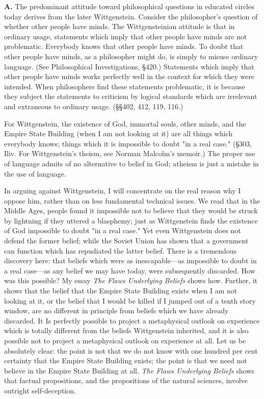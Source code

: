 \documentclass[10pt,twoside]{memoir}
\newcommand{\essaytitle}[1]{
	\emph{#1}}
\begin{document}
\begin{enumerate}
\textbf{A.} The predominant attitude toward philosophical questions in 
educated circles today derives from the later Wittgenstein. Consider the 
philosopher's question of whether other people have minds. The 
Wittgensteinian attitude is that in ordinary usage, statements which imply 
that other people have minds are not problematic. Everybody knows that 
other people have minds. To doubt that other people have minds, as a 
philosopher might do, is simply to misuse ordinary language. (See 
Philosophical Investigations, \S 420.) Statements which imply that other 
people have minds works perfectly well in the context for which they were 
intended. When philosophers find these statements problematic, it is because 
they subject the statements to criticism by logical standards which are 
irrelevant and extraneous to ordinary usage. (\S \S 402, 412, 119, 116.) 

For Wittgenstein, the existence of God, immortal souls, other minds, 
and the Empire State Building (when I am not looking at it) are all things 
which everybody knows; things which it is impossible to doubt "in a real 
case." (\S 303, Iliv. For Wittgenstein's theism, see Norman Malcolm's 
memoir.) The proper use of language admits of no alternative to belief in 
God; atheism is just a mistake in the use of language. 


In arguing against Wittgenstein, I will concentrate on the real reason 
why I oppose him, rather than on less fundamental technical issues. We read 
that in the Middle Ages, people found it impossible not to believe that they 
would be struck by lightning if they uttered a blasphemy; just as 
Wittgenstein finds the existence of God impossible to doubt "in a real case." 
Yet even Wittgenstein does not defend the former belief; while the Soviet 
Union has shown that a government can function which has repudiated the 
latter belief. There is a tremendous discovery here: that beliefs which were as 
inescapable---as impossible to doubt in a real case---as any belief we may have 
today, were subsequently discarded. How was this possible? My essay \essaytitle{The 
Flaws Underlying Beliefs} shows how. Further, it shows that the belief that 
the Empire State Building exists when I am not looking at it, or the belief 
that I would be killed if I jumped out of a tenth story window, are no 
different in principle from beliefs which we have already discarded. It Is 
perfectly possible to project a metaphysical outlook on experience which is 
totally different from the beliefs Wittgenstein inherited, and it is also 
possible not to project a metaphysical outlook on experience at all. Let us be 
absolutely clear: the point is not that we do not know with one hundred per 
cent certainty that the Empire State Building exists; the point is that we 
need not believe in the Empire State Building at all. \essaytitle{The Flaws Underlying 
Beliefs} shows that factual propositions, and the propositions of the natural 
sciences, involve outright self-deception. 


\end{enumerate}
\end{document}
